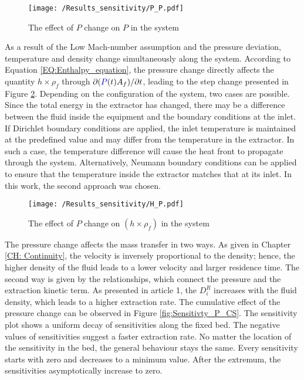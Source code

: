 \documentclass[../Article_Model_Parameters.tex]{subfiles}
\begin{document}
    \begin{figure}[h!]
    	\centering
    	\texttt{[image: /Results\_sensitivity/P\_P.pdf]}
    	\caption{The effect of $P$ change on $P$ in the system}
    	\label{fig:Sensitivty_P_P}
    \end{figure}
    
	As a result of the Low Mach-number assumption and the pressure deviation, temperature and density change simultaneously along the system. According to Equation \ref{EQ:Enthalpy_equation}, the pressure change directly affects the quantity $h \times \rho_f$ through $\partial ({\color{blue}P}(t) A_f) / \partial t$, leading to the step change presented in Figure \ref{fig:Sensitivty_P_H}. Depending on the configuration of the system, two cases are possible. Since the total energy in the extractor has changed, there may be a difference between the fluid inside the equipment and the boundary conditions at the inlet. If Dirichlet boundary conditions are applied, the inlet temperature is maintained at the predefined value and may differ from the temperature in the extractor. In such a case, the temperature difference will cause the heat front to propagate through the system. Alternatively, Neumann boundary conditions can be applied to ensure that the temperature inside the extractor matches that at its inlet. In this work, the second approach was chosen.
    
    \begin{figure}[h!]
    	\centering
    	\texttt{[image: /Results\_sensitivity/H\_P.pdf]}
    	\caption{The effect of $P$ change on $(h \times \rho_f)$ in the system}
    	\label{fig:Sensitivty_P_H}
    \end{figure}

	The pressure change affects the mass transfer in two ways. As given in Chapter \ref{CH: Continuity}, the velocity is inversely proportional to the density; hence, the higher density of the fluid leads to a lower velocity and larger residence time. The second way is given by the relationships, which connect the pressure and the extraction kinetic term. As presented in {\color{red}article 1}, the $D_i^R$ increases with the fluid density, which leads to a higher extraction rate. The cumulative effect of the pressure change can be observed in Figure \ref{fig:Sensitivty_P_CS}. The sensitivity plot shows a uniform decay of sensitivities along the fixed bed. The negative values of sensitivities suggest a faster extraction rate. No matter the location of the sensitivity in the bed, the general behaviour stays the same. Every sensitivity starts with zero and decreases to a minimum value. After the extremum, the sensitivities asymptotically increase to zero.
\end{document}
